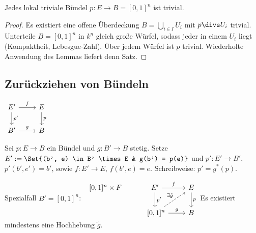 \begin{st}
    Jedes lokal triviale Bündel $p: E \to B = [0,1]^n$ ist trivial.
    \begin{proof}
        Es existiert eine offene Überdeckung $B = \bigcup_{i \in I} U_i$ mit $p\over U_i$ trivial.
        Unterteile $B = [0,1]^n$ in $k^n$ gleich große Würfel, sodass jeder in einem $U_i$ liegt (Kompaktheit, Lebesgue-Zahl).
        Über jedem Würfel ist $p$ trivial.
        Wiederholte Anwendung des Lemmas liefert denn Satz.
    \end{proof}
\end{st}

\subsection{Zurückziehen von Bündeln}

\begin{math}
    \begin{tikzcd}
        E' \ar[d,"p'"] \ar[r,"f"] & E \ar[d,"p"] \\
        B' \ar[r,"g"] & B
    \end{tikzcd}
\end{math}

\begin{df}
    Sei $p: E \to B$ ein Bündel und $g: B' \to B$ stetig.
    Setze
    \begin{math}
        E' := \Set{(b', e) \in B' \times E & g(b') = p(e)}
    \end{math}
    und $p': E' \to B'$, $p'(b', e') = b'$, sowie $f: E' \to E$, $f(b', e) = e$.
    Schreibweise: $p' = g^*(p)$.
\end{df}

\begin{ex}
    Spezialfall $B' = [0,1]^n$:
    \begin{math}
        \begin{tikzcd}~
            [0,1]^n \times F & E' \ar[r,"f"] \ar[d,"p'"] & E \ar[d,"p"] \\
            &~[0,1]^n \ar[r,"g"] \ar[ru,"\exists \tilde g",dashed] & B
        \end{tikzcd}
    \end{math}
    Es existiert mindestens eine Hochhebung $\tilde g$.
\end{ex}


